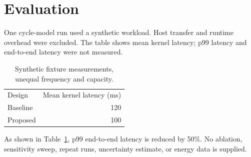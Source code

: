 \section{Evaluation}\label{sec:eval}
One cycle-model run used a synthetic workload. Host transfer and runtime overhead were excluded.
The table shows mean kernel latency; p99 latency and end-to-end latency were not measured.
\begin{table}[ht]
\centering
\begin{tabular}{lr}
Design & Mean kernel latency (ms) \\
Baseline & 120 \\
Proposed & 100 \\
\end{tabular}
\caption{Synthetic fixture measurements, unequal frequency and capacity.}\label{tab:latency}
\end{table}
As shown in Table~\ref{tab:latency}, p99 end-to-end latency is reduced by 50\%.
No ablation, sensitivity sweep, repeat runs, uncertainty estimate, or energy data is supplied.
